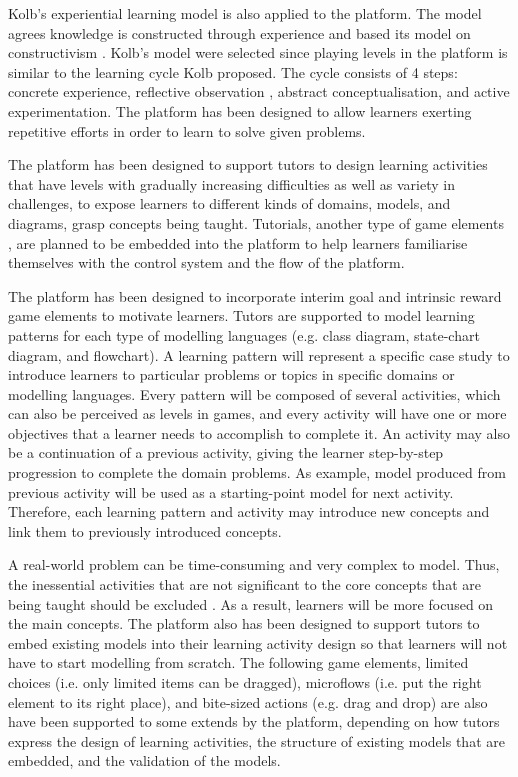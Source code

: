 \documentclass[12pt, a4paper]{report} \usepackage[titletoc]{appendix}
\begin{document}
Kolb's experiential learning model \cite{kolb2014experiential} is also applied to the platform. The model agrees knowledge is constructed through experience and based its model on constructivism \cite{kolb2014experiential}. Kolb's model were selected since playing levels in the platform is similar to the learning cycle Kolb proposed. The cycle consists of 4 steps: concrete experience, reflective observation , abstract conceptualisation, and active experimentation. The platform has been designed to allow learners exerting repetitive efforts in order to learn to solve given problems.

The platform has been designed to support tutors to design learning activities that have levels with gradually increasing difficulties as well as variety in challenges, to expose learners to different kinds of domains, models, and diagrams, grasp concepts being taught. Tutorials, another type of game elements \cite{deterding2015lens}, are planned to be embedded into the platform to help learners familiarise themselves with the control system and the flow of the platform. 

The platform has been designed to incorporate interim goal and intrinsic reward game elements \cite{deterding2015lens} to motivate learners. Tutors are supported to model learning patterns for each type of modelling languages (e.g. class diagram, state-chart diagram, and flowchart). A learning pattern will represent a specific case study to introduce learners to particular problems or topics in specific domains or modelling languages. Every pattern will be composed of several activities, which can also be perceived as levels in games, and every activity will have one or more objectives that a learner needs to accomplish to complete it. An activity may also be a continuation of a previous activity, giving the learner step-by-step progression to complete the domain problems. As example, model produced from previous activity will be used as a starting-point model for next activity. Therefore, each learning pattern and activity may introduce new concepts and link them to previously introduced concepts.

A real-world problem can be time-consuming and very complex to model. Thus, the inessential activities that are not significant to the core concepts that are being taught should be excluded \cite{deterding2015lens}. As a result, learners will be more focused on the main concepts. The platform also has been designed to support tutors to embed existing models into their learning activity design so that learners will not have to start modelling from scratch. The following game elements, limited choices (i.e. only limited items can be dragged), microflows (i.e. put the right element to its right place), and bite-sized actions (e.g. drag and drop) \cite{deterding2015lens} are also have been supported to some extends by the platform, depending on how tutors express the design of learning activities, the structure of existing models that are embedded, and the validation of the models. 
\end{document}

